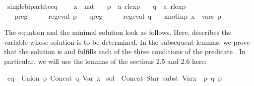 \begin{isabellebody}
\begin{isamarkuptext}
\end{isamarkuptext}\isamarkuptrue%
\isamarkupfalse%
\ single{\isacharunderscore}{\kern0pt}bipartite{\isacharunderscore}{\kern0pt}eq\ {\isacharequal}{\kern0pt}\isanewline
\ \ \ x\ {\isacharcolon}{\kern0pt}{\isacharcolon}{\kern0pt}\ {\isachardoublequoteopen}nat{\isachardoublequoteclose}\isanewline
\ \ \ p\ {\isacharcolon}{\kern0pt}{\isacharcolon}{\kern0pt}\ {\isachardoublequoteopen}{\isacharprime}{\kern0pt}a\ rlexp{\isachardoublequoteclose}\isanewline
\ \ \ q\ {\isacharcolon}{\kern0pt}{\isacharcolon}{\kern0pt}\ {\isachardoublequoteopen}{\isacharprime}{\kern0pt}a\ rlexp{\isachardoublequoteclose}\isanewline
\ \ \ p{\isacharunderscore}{\kern0pt}reg{\isacharcolon}{\kern0pt}\ \ \ \ \ \ {\isachardoublequoteopen}reg{\isacharunderscore}{\kern0pt}eval\ p{\isachardoublequoteclose}\isanewline
\ \ \ q{\isacharunderscore}{\kern0pt}reg{\isacharcolon}{\kern0pt}\ \ \ \ \ \ {\isachardoublequoteopen}reg{\isacharunderscore}{\kern0pt}eval\ q{\isachardoublequoteclose}\isanewline
\ \ \ x{\isacharunderscore}{\kern0pt}not{\isacharunderscore}{\kern0pt}in{\isacharunderscore}{\kern0pt}p{\isacharcolon}{\kern0pt}\ {\isachardoublequoteopen}x\ {\isasymnotin}\ vars\ p{\isachardoublequoteclose}\isanewline
{}%
\begin{isamarkuptext}%
The equation and the minimal solution look as follows. Here,  describes the variable whose
solution is to be determined. In the subsequent lemmas, we prove that the solution is 
and fulfills each of the three conditions of the predicate .
In particular, we will use the lemmas of the sections 2.5 and 2.6 here:%
\end{isamarkuptext}\isamarkuptrue%
\isamarkupfalse%
\ {\isachardoublequoteopen}eq\ {\isasymequiv}\ Union\ p\ {\isacharparenleft}{\kern0pt}Concat\ q\ {\isacharparenleft}{\kern0pt}Var\ x{\isacharparenright}{\kern0pt}{\isacharparenright}{\kern0pt}{\isachardoublequoteclose}\isanewline
{}\isamarkupfalse%
\ {\isachardoublequoteopen}sol\ {\isasymequiv}\ Concat\ {\isacharparenleft}{\kern0pt}Star\ {\isacharparenleft}{\kern0pt}subst\ {\isacharparenleft}{\kern0pt}Var{\isacharparenleft}{\kern0pt}x\ {\isacharcolon}{\kern0pt}{\isacharequal}{\kern0pt}\ p{\isacharparenright}{\kern0pt}{\isacharparenright}{\kern0pt}\ q{\isacharparenright}{\kern0pt}{\isacharparenright}{\kern0pt}\ p{\isachardoublequoteclose}\isanewline

\end{isabellebody}
